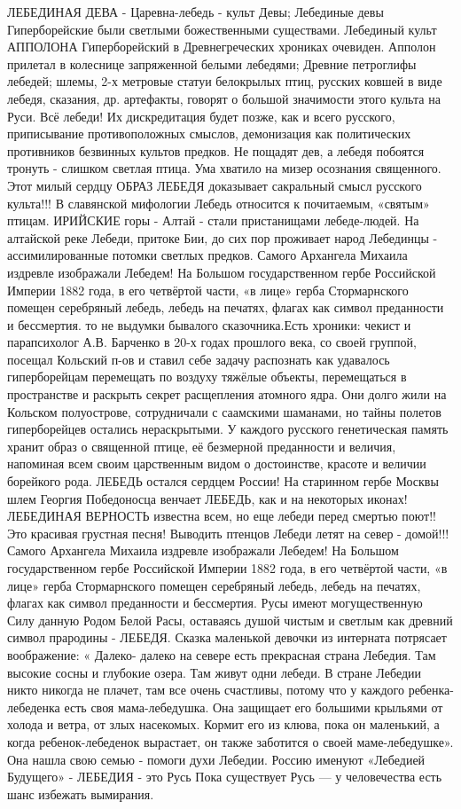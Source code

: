 ЛЕБЕДИНАЯ ДЕВА - Царевна-лебедь - культ Девы;
Лебединые девы Гиперборейские были светлыми божественными существами.
Лебединый культ АППОЛОНА  Гиперборейский в  Древнегреческих хрониках  очевиден. Апполон прилетал в колеснице запряженной белыми лебедями;
Древние петроглифы лебедей; шлемы, 2-х метровые статуи белокрылых птиц, русских ковшей в виде лебедя, сказания,  др. артефакты, говорят о большой  значимости  этого культа на Руси.  Всё лебеди! 
Их дискредитация будет позже,  как и всего русского, приписывание противоположных смыслов, демонизация как политических противников  безвинных культов предков.   Не пощадят дев, а лебедя побоятся тронуть - слишком светлая птица. Ума хватило на мизер осознания священного.
Этот милый сердцу ОБРАЗ ЛЕБЕДЯ доказывает сакральный смысл русского культа!!!
В славянской мифологии Лебедь относится к почитаемым, «святым» птицам.
ИРИЙСКИЕ горы - Алтай - стали  пристанищами  лебеде-людей. На алтайской реке Лебеди, притоке Бии, до сих пор проживает народ Лебединцы - ассимилированные потомки светлых предков.
Самого Архангела Михаила издревле изображали Лебедем!
На Большом государственном гербе Российской Империи 1882 года, в его четвёртой части, «в лице» герба Стормарнского помещен серебряный лебедь, лебедь на печатях, флагах как символ преданности и бессмертия.
то не выдумки бывалого сказочника.Есть хроники: чекист и парапсихолог А.В. Барченко в 20-х годах прошлого века, со своей группой, посещал Кольский п-ов и ставил себе задачу распознать как удавалось гиперборейцам перемещать по воздуху тяжёлые объекты, перемещаться в пространстве и раскрыть секрет расщепления атомного ядра. Они долго жили на Кольском полуострове, сотрудничали с саамскими шаманами, но тайны полетов гиперборейцев остались нераскрытыми.
У  каждого русского генетическая память хранит образ о священной птице, её безмерной преданности и величия, напоминая всем своим царственным видом о достоинстве, красоте и величии борейкого рода.
ЛЕБЕДЬ  остался сердцем России! 
                                          На старинном гербе Москвы шлем Георгия Победоносца венчает ЛЕБЕДЬ, как и на некоторых иконах!
ЛЕБЕДИНАЯ ВЕРНОСТЬ известна всем, но еще лебеди перед смертью поют!!
Это красивая грустная песня! Выводить птенцов Лебеди летят на север - домой!!!
Самого Архангела Михаила издревле изображали Лебедем!
На Большом государственном гербе Российской Империи 1882 года, в его четвёртой части, «в лице» герба Стормарнского помещен серебряный лебедь, лебедь на печатях, флагах как символ преданности и бессмертия.
Русы имеют могущественную Силу данную Родом Белой Расы, оставаясь душой чистым и светлым как древний символ прародины - ЛЕБЕДЯ.
Сказка маленькой девочки из интерната потрясает воображение: « Далеко- далеко на севере есть прекрасная страна Лебедия. Там высокие сосны и глубокие озера. Там живут одни лебеди. В стране Лебедии никто никогда не плачет, там все очень счастливы, потому что у каждого ребенка-лебеденка есть своя мама-лебедушка. Она защищает его большими крыльями от холода и ветра, от злых насекомых. Кормит его из клюва, пока он маленький, а когда ребенок-лебеденок вырастает, он также заботится о своей маме-лебедушке». Она нашла свою семью - помоги духи Лебедии.
Россию именуют «Лебедией Будущего» - ЛЕБЕДИЯ - это Русь
Пока существует Русь — у человечества есть шанс избежать вымирания.

